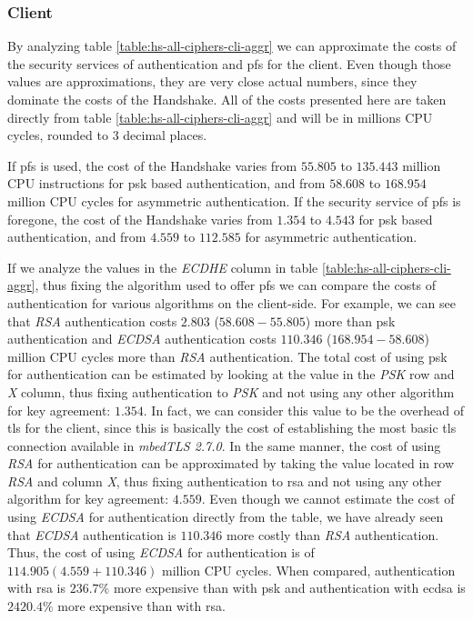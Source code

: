 \documentclass{llncs}
\begin{document}
\subsubsection{Client}

By analyzing table \ref{table:hs-all-ciphers-cli-aggr}  we can approximate
the costs of the security services of authentication and \gls{pfs} for the client. Even though those values are approximations,
they are very close actual numbers, since they dominate the costs of the Handshake. All of the costs presented here
are taken directly from table \ref{table:hs-all-ciphers-cli-aggr} and will be in millions CPU cycles,
rounded to $3$ decimal places.

If \gls{pfs} is used, the cost of the Handshake varies from $55.805$ to $135.443$
million CPU instructions for \gls{psk} based authentication, and from $58.608$ to $168.954$ million CPU cycles for
asymmetric authentication. If the security service of \gls{pfs} is foregone, the cost
of the Handshake varies from $1.354$ to $4.543$ for \gls{psk} based authentication,
and from $4.559$ to $112.585$ for asymmetric authentication.

If we analyze the values in the \textit{ECDHE} column in table \ref{table:hs-all-ciphers-cli-aggr}, thus fixing the
algorithm used to offer \gls{pfs} we can compare the costs of authentication for various algorithms on the client-side.
For example, we can see that \textit{RSA} authentication costs $2.803$  ($58.608 - 55.805$)
more than \gls{psk} authentication and \textit{ECDSA} authentication costs $110.346$ ($168.954 - 58.608$)
million CPU cycles more than
\textit{RSA} authentication. The total cost of using \gls{psk} for authentication can be estimated by looking at the
value in the \textit{PSK} row and \textit{X} column, thus fixing authentication to \textit{PSK} and not using any other
algorithm for key agreement: $1.354$. In fact, we can consider this value to be the overhead of \gls{tls} for the client,
since this is basically the cost of establishing the most basic \gls{tls} connection available in \textit{mbedTLS 2.7.0}.
In the same manner, the cost of using \textit{RSA} for authentication can
be approximated by taking the value located in row \textit{RSA} and column \textit{X}, thus fixing authentication
to \gls{rsa} and not using any other algorithm for key agreement: $4.559$. Even though we cannot estimate the cost
of using \textit{ECDSA} for authentication directly from the table, we have already seen that \textit{ECDSA} authentication
is $110.346$ more costly than \textit{RSA} authentication. Thus, the cost of using \textit{ECDSA} for authentication
is of $114.905 (4.559+110.346)$ million CPU cycles. When compared, authentication with \gls{rsa} is
$236.7\%$ more expensive than with \gls{psk} and authentication with \gls{ecdsa} is $2420.4\%$ more
expensive than with \gls{rsa}.
\end{document}
